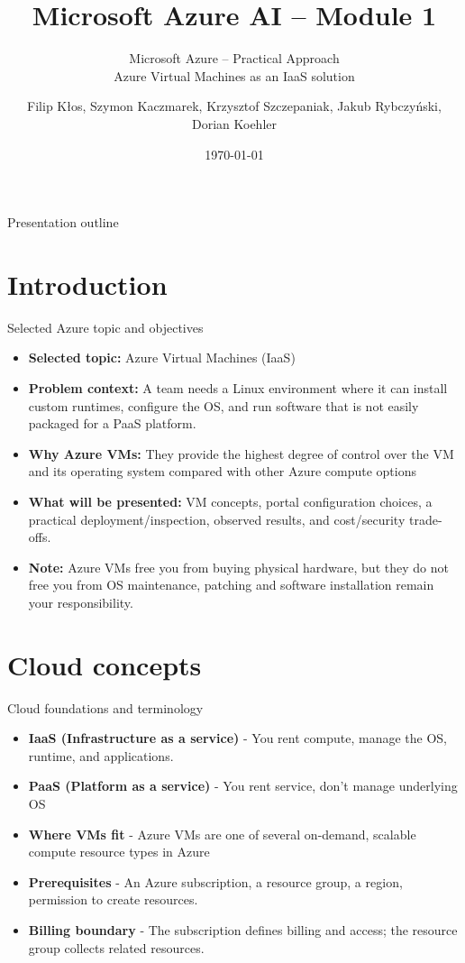 \documentclass[aspectratio=169,xcolor=dvipsnames]{beamer}
\title[Azure AI -- Module 1]{Microsoft Azure AI -- Module 1}
\subtitle{Microsoft Azure -- Practical Approach \\ Azure Virtual Machines as an IaaS solution}
\author[Student / team]{Filip Kłos, Szymon Kaczmarek, Krzysztof Szczepaniak, Jakub Rybczyński, Dorian Koehler}
\institute[SUT]{Faculty of Applied Mathematics\\Silesian University of Technology}
\date{\today}
\begin{document}
	\begin{frame}
		\titlepage
	\end{frame}
	\begin{frame}{Presentation outline}
		\tableofcontents
	\end{frame}
	\section{Introduction}
	\begin{frame}{Selected Azure topic and objectives}
		\begin{itemize}
			\item \textbf{Selected topic:} Azure Virtual Machines (IaaS)
			\item \textbf{Problem context:} A team needs a Linux environment where it can install custom runtimes, configure the OS, and run software that is not easily packaged for a PaaS platform.
			\item \textbf{Why Azure VMs:} They provide the highest degree of control over the VM and its operating system compared with other Azure compute options
			\item \textbf{What will be presented:} VM concepts, portal configuration choices, a practical deployment/inspection, observed results, and cost/security trade-offs.
			\item \textbf{Note:} Azure VMs free you from buying physical hardware, but they do not free you from OS maintenance, patching and software installation remain your responsibility.
		\end{itemize}
	\end{frame}
	\section{Cloud concepts}
	\begin{frame}{Cloud foundations and terminology}
		\begin{itemize}
			\item \textbf{IaaS (Infrastructure as a service)} - You rent compute, manage the OS, runtime, and applications.
			\item \textbf{PaaS (Platform as a service)} - You rent service, don't manage underlying OS
			\item \textbf{Where VMs fit} - Azure VMs are one of several on-demand, scalable compute resource types in Azure
			\item \textbf{Prerequisites} - An Azure subscription, a resource group, a region, permission to create resources.
			\item \textbf{Billing boundary} - The subscription defines billing and access; the resource group collects related resources.
		\end{itemize}
	\end{frame}
\end{document}
